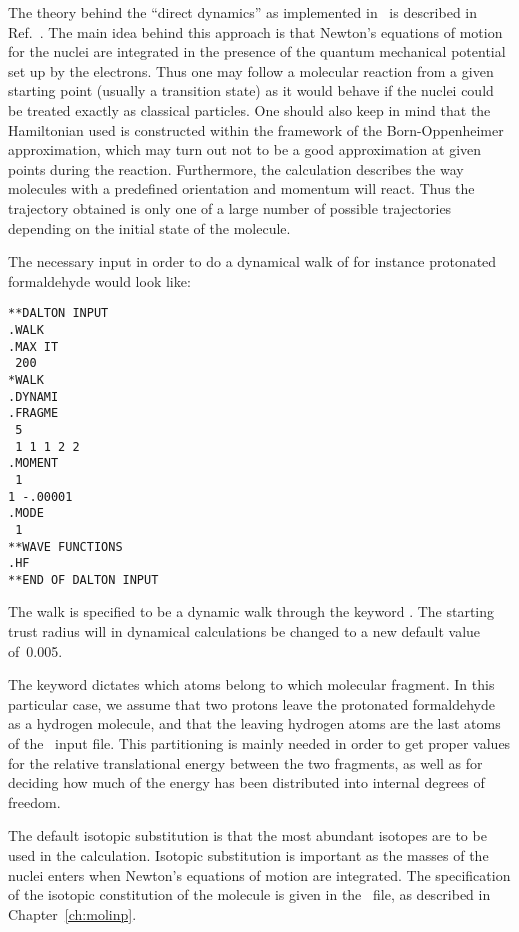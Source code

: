 The theory behind the ``direct dynamics'' as implemented in \dalton\ is
described in Ref.~\cite{theuhjajcpl173}. The
main idea behind this
approach is that Newton's equations of motion for the nuclei are
integrated in the presence of the quantum mechanical potential set up
by the electrons. Thus one may follow a molecular reaction from a
given starting point (usually a transition state) as it would behave
if the nuclei could be treated exactly as classical particles. One
should also keep in mind that the Hamiltonian used is constructed within
the framework of the Born-Oppenheimer approximation, which may turn
out not to be a good approximation at given points during the
reaction. Furthermore, the calculation describes the way molecules
with a predefined orientation and momentum will react. Thus
the trajectory obtained is only one of a large number of
possible trajectories depending on the initial state of the molecule.

The necessary input in order to do a dynamical walk of for instance
protonated formaldehyde would look like:

\begin{verbatim}
**DALTON INPUT
.WALK
.MAX IT
 200
*WALK
.DYNAMI
.FRAGME
 5
 1 1 1 2 2
.MOMENT
 1
1 -.00001
.MODE
 1
**WAVE FUNCTIONS
.HF
**END OF DALTON INPUT
\end{verbatim}

The walk is specified to
be a dynamic walk  through the keyword . The
starting trust radius will in dynamical calculations be changed to a
new default value of~0.005.

The keyword  dictates which atoms belong to which
molecular fragment. In this particular
case, we assume that two
protons leave the protonated formaldehyde as a
hydrogen molecule, and
that the leaving hydrogen atoms are the last atoms of the \molinp\ input
file. This partitioning is mainly needed in order to get
proper values for the relative translational energy between the two
fragments, as well as for deciding how much of the energy has been
distributed into internal degrees of freedom.

The default isotopic substitution is that the most abundant
isotopes are to be used in the calculation. Isotopic
substitution is important as the masses of the nuclei enters when
Newton's equations of motion are integrated. The specification of the
isotopic constitution of the molecule is given in the
\molinp\ file, as described in Chapter~\ref{ch:molinp}.

